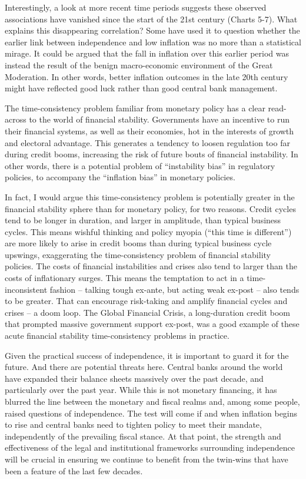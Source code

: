 \documentclass[
]{book}
\begin{document}
Interestingly, a look at more recent time periods suggests these observed associations have vanished since the start of the 21st century (Charts 5-7). What explains this disappearing correlation? Some have used it to question whether the earlier link between independence and low inflation was no more than a statistical mirage. It could be argued that the fall in inflation over this earlier period was instead the result of the benign macro-economic environment of the Great Moderation. In other words, better inflation outcomes in the late 20th century might have reflected good luck rather than good central bank management.

The time-consistency problem familiar from monetary policy has a clear read-across to the world of financial stability. Governments have an incentive to run their financial systems, as well as their economies, hot in the interests of growth and electoral advantage. This generates a tendency to loosen regulation too far during credit booms, increasing the risk of future bouts of financial instability. In other words, there is a potential problem of ``instability bias'' in regulatory policies, to accompany the ``inflation bias'' in monetary policies.

In fact, I would argue this time-consistency problem is potentially greater in the financial stability sphere than for monetary policy, for two reasons. Credit cycles tend to be longer in duration, and larger in amplitude, than typical business cycles. This means wishful thinking and policy myopia (``this time is different'') are more likely to arise in credit booms than during typical business cycle upswings, exaggerating the time-consistency problem of financial stability policies.
The costs of financial instabilities and crises also tend to larger than the costs of inflationary surges. This means the temptation to act in a time-inconsistent fashion -- talking tough ex-ante, but acting weak ex-post -- also tends to be greater. That can encourage risk-taking and amplify financial cycles and crises -- a doom loop. The Global Financial Crisis, a long-duration credit boom that prompted massive government support ex-post, was a good example of these acute financial stability time-consistency problems in practice.

Given the practical success of independence, it is important to guard it for the future. And there are potential threats here. Central banks around the world have expanded their balance sheets massively over the past decade, and particularly over the past year. While this is not monetary financing, it has blurred the line between the monetary and fiscal realms and, among some people, raised questions of independence. The test will come if and when inflation begins to rise and central banks need to tighten policy to meet their mandate, independently of the prevailing fiscal stance. At that point, the strength and effectiveness of the legal and institutional frameworks surrounding independence will be crucial in ensuring we continue to benefit from the twin-wins that have been a feature of the last few decades.
\end{document}
